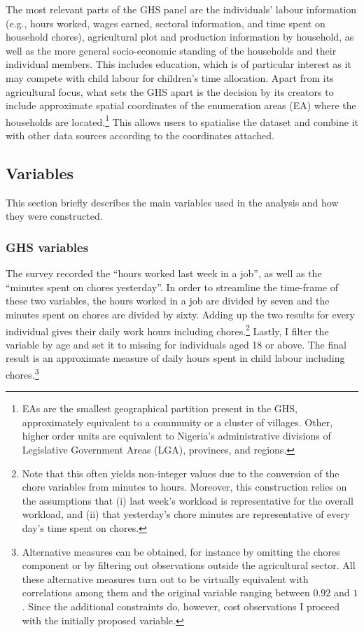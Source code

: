 \documentclass[a4paper,12pt]{article}
\theoremstyle{plain}
\theoremstyle{definition}
\theoremstyle{definition}
\theoremstyle{definition}
\theoremstyle{definition}
\begin{document}
The most relevant parts of the GHS panel are the individuals' labour information (e.g., hours worked, wages earned, sectoral information, and time spent on household chores), agricultural plot and production information by household, as well as the more general socio-economic standing of the households and their individual members. This includes education, which is of particular interest as it may compete with child labour for children's time allocation. Apart from its agricultural focus, what sets the GHS apart is the decision by its creators to include approximate spatial coordinates of the enumeration areas (EA) where the households are located.\footnote{EAs are the smallest geographical partition present in the GHS, approximately equivalent to a community or a cluster of villages. Other, higher order units are equivalent to Nigeria's administrative divisions of Legislative Government Areas (LGA), provinces, and regions.} This allows users to spatialise the dataset and combine it with other data sources according to the coordinates attached.

\subsection{Variables}
\label{sub:variables}

This section briefly describes the main variables used in the analysis and how they were constructed.

\subsubsection{GHS variables}
\label{subsub:ghsvars}
The survey recorded the ``hours worked last week in a job'', as well as the ``minutes spent on chores yesterday''. In order to streamline the time-frame of these two variables, the hours worked in a job are divided by seven and the minutes spent on chores are divided by sixty. Adding up the two results for every individual gives their daily work hours including chores.\footnote{Note that this often yields non-integer values due to the conversion of the chore variables from minutes to hours. Moreover, this construction relies on the assumptions that (i) last week's workload is representative for the overall workload, and (ii) that yesterday's chore minutes are representative of every day's time spent on chores.} Lastly, I filter the variable by age and set it to missing for individuals aged 18 or above. The final result is an approximate measure of daily hours spent in child labour including chores.\footnote{Alternative measures can be obtained, for instance by omitting the chores component or by filtering out observations outside the agricultural sector. All these alternative measures turn out to be virtually equivalent with correlations among them and the original variable ranging between $0.92$ and $1$. Since the additional constraints do, however, cost observations I proceed with the initially proposed variable.}
\end{document}
